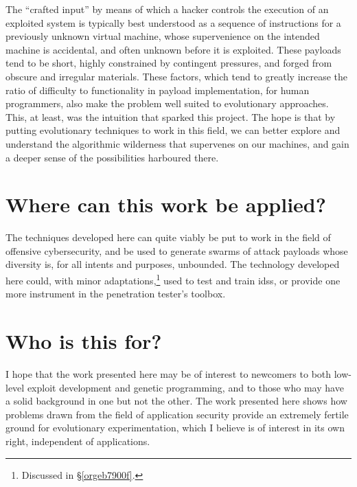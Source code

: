 \documentclass[12pt,glossary]{dalthesis}
\begin{document}
The ``crafted input'' by means of which a hacker controls the execution of
an exploited system is typically best understood as a sequence of instructions
for a previously unknown virtual machine, whose supervenience on the intended
machine is accidental, and often unknown before it is exploited.
These payloads tend to be short, highly constrained by contingent
pressures, and forged from obscure and irregular materials. These factors,
which tend to greatly increase the ratio of difficulty to functionality in
payload implementation, for human programmers, also make the problem
well suited to evolutionary approaches. This, at least, was the intuition
that sparked this project. The hope is that by putting evolutionary techniques
to work in this field, we can better explore and understand the algorithmic
wilderness that supervenes on our machines, and gain a deeper sense of the
possibilities harboured there.

\section{Where can this work be applied?}
\label{sec:org45d9038}
The techniques developed here can quite viably be put to work in the field of
offensive cybersecurity, and be used to generate swarms of attack payloads whose
diversity is, for all intents and purposes, unbounded. The technology developed
here could, with minor adaptations,\footnote{Discussed in \S \ref{orgeb7900f}.} used
to test and train \glspl{ids}, or provide one more instrument in the penetration
tester's toolbox.

\section{Who is this for?}
\label{sec:org10b4fd0}

I hope that the work presented here may be of interest to newcomers to
both low-level exploit development and genetic programming, and to those
who may have a solid background in one but not the other. The work presented
here shows how problems drawn from the field of application security provide
an extremely fertile ground for evolutionary experimentation, which I believe
is of interest in its own right, independent of applications. 
\end{document}
